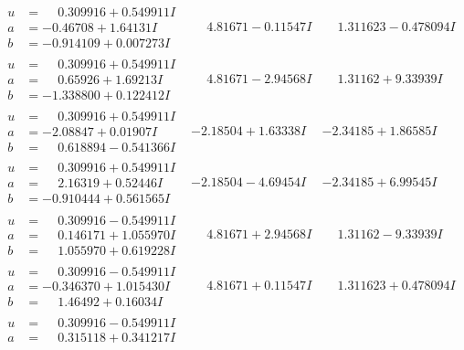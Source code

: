 \documentclass[1p]{elsarticle_modified}
\theoremstyle{definition}
\begin{document}
$$\begin{array}{c|c|c}
\begin{aligned}
u &= \phantom{-}0.309916 + 0.549911 I \\
a &= -0.46708 + 1.64131 I \\
b &= -0.914109 + 0.007273 I\end{aligned}
 & \phantom{-}4.81671 - 0.11547 I & \phantom{-}1.311623 - 0.478094 I \\ \hline\begin{aligned}
u &= \phantom{-}0.309916 + 0.549911 I \\
a &= \phantom{-}0.65926 + 1.69213 I \\
b &= -1.338800 + 0.122412 I\end{aligned}
 & \phantom{-}4.81671 - 2.94568 I & \phantom{-}1.31162 + 9.33939 I \\ \hline\begin{aligned}
u &= \phantom{-}0.309916 + 0.549911 I \\
a &= -2.08847 + 0.01907 I \\
b &= \phantom{-}0.618894 - 0.541366 I\end{aligned}
 & -2.18504 + 1.63338 I & -2.34185 + 1.86585 I \\ \hline\begin{aligned}
u &= \phantom{-}0.309916 + 0.549911 I \\
a &= \phantom{-}2.16319 + 0.52446 I \\
b &= -0.910444 + 0.561565 I\end{aligned}
 & -2.18504 - 4.69454 I & -2.34185 + 6.99545 I \\ \hline\begin{aligned}
u &= \phantom{-}0.309916 - 0.549911 I \\
a &= \phantom{-}0.146171 + 1.055970 I \\
b &= \phantom{-}1.055970 + 0.619228 I\end{aligned}
 & \phantom{-}4.81671 + 2.94568 I & \phantom{-}1.31162 - 9.33939 I \\ \hline\begin{aligned}
u &= \phantom{-}0.309916 - 0.549911 I \\
a &= -0.346370 + 1.015430 I \\
b &= \phantom{-}1.46492 + 0.16034 I\end{aligned}
 & \phantom{-}4.81671 + 0.11547 I & \phantom{-}1.311623 + 0.478094 I \\ \hline\begin{aligned}
u &= \phantom{-}0.309916 - 0.549911 I \\
a &= \phantom{-}0.315118 + 0.341217 I \\

\end{aligned}
\end{array}$$
\end{document}
